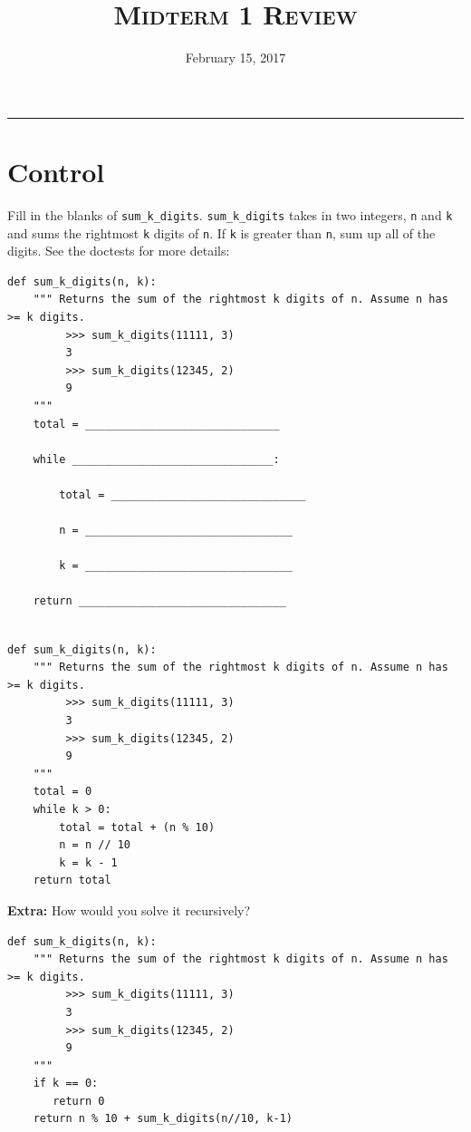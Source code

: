 \documentclass{exam}
\title{\textsc{Midterm 1 Review}}
\date{February 15, 2017}
\begin{document}
\maketitle
\rule{\textwidth}{0.15em}
\fontsize{12}{15}\selectfont




\section{Control}
\begin{questions}

\item Fill in the blanks of \texttt{sum\_k\_digits}. \texttt{sum\_k\_digits} takes in two integers, \texttt{n} and \texttt{k} and sums the rightmost \texttt{k} digits of \texttt{n}. If \texttt{k} is greater than \texttt{n}, sum up all of the digits. See the doctests for more details:
\newline
\begin{lstlisting}
def sum_k_digits(n, k):
	""" Returns the sum of the rightmost k digits of n. Assume n has >= k digits.
	     >>> sum_k_digits(11111, 3)
	     3
	     >>> sum_k_digits(12345, 2)
	     9
	"""
	total = ______________________________
	
	while _______________________________:
	
		total = ______________________________
		
		n = ________________________________
		
		k = ________________________________
		
	return ________________________________


\end{lstlisting}
\begin{solution}
\begin{lstlisting}
def sum_k_digits(n, k):
	""" Returns the sum of the rightmost k digits of n. Assume n has >= k digits.
	     >>> sum_k_digits(11111, 3)
	     3
	     >>> sum_k_digits(12345, 2)
	     9
	"""
	total = 0
	while k > 0:
		total = total + (n % 10)
		n = n // 10
		k = k - 1
	return total

\end{lstlisting}
\end{solution}

\item \textbf{Extra: } How would you solve it recursively?
\begin{solution}
\begin{lstlisting}
def sum_k_digits(n, k):
	""" Returns the sum of the rightmost k digits of n. Assume n has >= k digits.
	     >>> sum_k_digits(11111, 3)
	     3
	     >>> sum_k_digits(12345, 2)
	     9
	"""
	if k == 0:
	   return 0
	return n % 10 + sum_k_digits(n//10, k-1)

\end{lstlisting}
\end{solution}
\end{questions}
\clearpage
\end{document}

